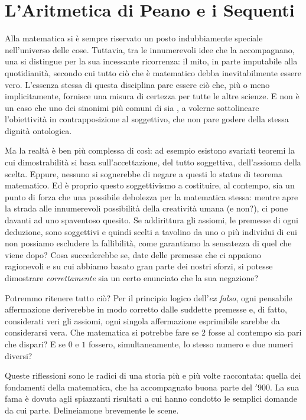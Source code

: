 \chapter{L'Aritmetica di Peano e i Sequenti}
		
		Alla matematica si è sempre riservato un posto indubbiamente speciale nell'universo delle cose. Tuttavia, tra le innumerevoli idee che la accompagnano, una si distingue per la sua incessante ricorrenza: il mito, in parte imputabile alla quotidianità, secondo cui tutto ciò che è matematico debba inevitabilmente essere vero. L'essenza stessa di questa disciplina pare essere ciò che, più o meno implicitamente, fornisce una misura di certezza per tutte le altre scienze. E non è un caso che uno dei sinonimi più comuni di  sia , a volerne sottolineare l'obiettività in contrapposizione al soggettivo, che non pare godere della stessa dignità ontologica.
		
		Ma la realtà è ben più complessa di così: ad esempio esistono svariati teoremi la cui dimostrabilità si basa sull'accettazione, del tutto soggettiva, dell'assioma della scelta. Eppure, nessuno si sognerebbe di negare a questi lo status di teorema matematico. Ed è proprio questo soggettivismo a costituire, al contempo, sia un punto di forza che una possibile debolezza per la matematica stessa: mentre apre la strada alle innumerevoli possibilità della creatività umana (e non?), ci pone davanti ad uno spaventoso quesito. %
		Se addirittura gli assiomi, le premesse di ogni deduzione, sono soggettivi e quindi scelti a tavolino da uno o più individui di cui non possiamo escludere la fallibilità, come garantiamo la sensatezza di quel che viene dopo? Cosa succederebbe se, date delle premesse che ci appaiono ragionevoli e su cui abbiamo basato gran parte dei nostri sforzi, si potesse dimostrare \emph{correttamente} sia un certo enunciato che la sua negazione?
		
		Potremmo ritenere  tutto ciò? Per il principio logico dell'\emph{ex falso}, ogni pensabile affermazione deriverebbe in modo corretto dalle suddette premesse e, di fatto, considerati veri gli assiomi, ogni singola affermazione esprimibile sarebbe da considerarsi vera. Che matematica si potrebbe fare se $2$ fosse al contempo sia pari che dispari? E se $0$ e $1$ fossero, simultaneamente, lo stesso numero e due numeri diversi?
		
		Queste riflessioni sono le radici di una storia più e più volte raccontata: quella dei fondamenti della matematica, che ha accompagnato buona parte del $'900$. La sua fama è dovuta agli spiazzanti risultati a cui hanno condotto le semplici domande da cui parte. Delineiamone brevemente le scene.
		

